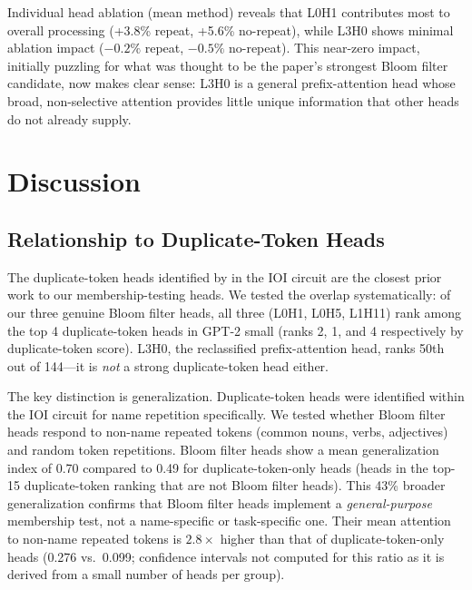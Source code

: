 \documentclass[11pt]{article}
\begin{document}
Individual head ablation (mean method) reveals that L0H1 contributes most to overall processing (+3.8\% repeat, +5.6\% no-repeat), while L3H0 shows minimal ablation impact ($-0.2\%$ repeat, $-0.5\%$ no-repeat). This near-zero impact, initially puzzling for what was thought to be the paper's strongest Bloom filter candidate, now makes clear sense: L3H0 is a general prefix-attention head whose broad, non-selective attention provides little unique information that other heads do not already supply.

\section{Discussion}

\subsection{Relationship to Duplicate-Token Heads}
\label{sec:discussion_dup}

The duplicate-token heads identified by \citet{wang2022interpretability} in the IOI circuit are the closest prior work to our membership-testing heads. We tested the overlap systematically: of our three genuine Bloom filter heads, all three (L0H1, L0H5, L1H11) rank among the top 4 duplicate-token heads in GPT-2 small (ranks 2, 1, and 4 respectively by duplicate-token score). L3H0, the reclassified prefix-attention head, ranks 50th out of 144---it is \emph{not} a strong duplicate-token head either.

The key distinction is generalization. Duplicate-token heads were identified within the IOI circuit for name repetition specifically. We tested whether Bloom filter heads respond to non-name repeated tokens (common nouns, verbs, adjectives) and random token repetitions. Bloom filter heads show a mean generalization index of 0.70 compared to 0.49 for duplicate-token-only heads (heads in the top-15 duplicate-token ranking that are not Bloom filter heads). This 43\% broader generalization confirms that Bloom filter heads implement a \emph{general-purpose} membership test, not a name-specific or task-specific one. Their mean attention to non-name repeated tokens is $2.8\times$ higher than that of duplicate-token-only heads (0.276 vs.\ 0.099; confidence intervals not computed for this ratio as it is derived from a small number of heads per group).
\end{document}
